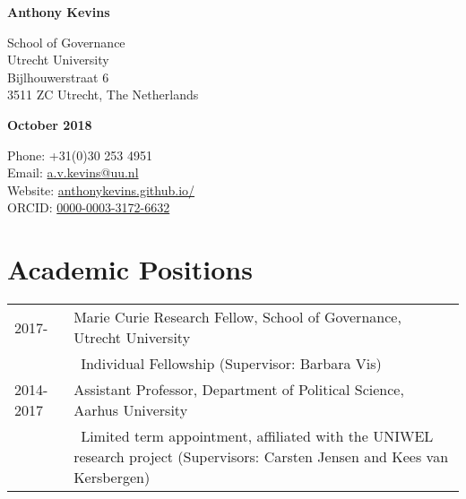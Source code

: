 \documentclass[letterpaper,fontsize=10pt]{scrartcl}
\begin{document}
	\begin{minipage}[t]{0.5\textwidth}
		\huge \textbf{Anthony Kevins}\\
		\normalsize

		School of Governance\\
		Utrecht University\\
		Bijlhouwerstraat 6\\
		3511 ZC Utrecht, The Netherlands\\
	\end{minipage}
	\begin{minipage}[t]{0.5\textwidth}
		\scriptsize \textbf{October 2018}\\
		\normalsize

		Phone: +31(0)30 253 4951\\
		Email: \href{mailto:a.v.kevins@uu.nl}{a.v.kevins@uu.nl}\\
		Website: \href{https://anthonykevins.github.io/}{anthonykevins.github.io/}\\
		ORCID: \href{https://orcid.org/0000-0003-3172-6632}{0000-0003-3172-6632}\\
	\end{minipage}

	\hrulefill

	\section{Academic Positions}
	\vspace{-1.5em}
	\begin{tabularx}{\textwidth}{@{} l X @{} }
		2017- & Marie Curie Research Fellow, School of Governance, Utrecht University\\
	& \textbullet\ Individual Fellowship (Supervisor: Barbara Vis)\\[1ex]
		2014-2017 & Assistant Professor, Department of Political Science, Aarhus University\\
				& \textbullet\ Limited term appointment, affiliated with the UNIWEL research project (Supervisors: Carsten Jensen and Kees van Kersbergen)\\
	\end{tabularx}

\end{document}
